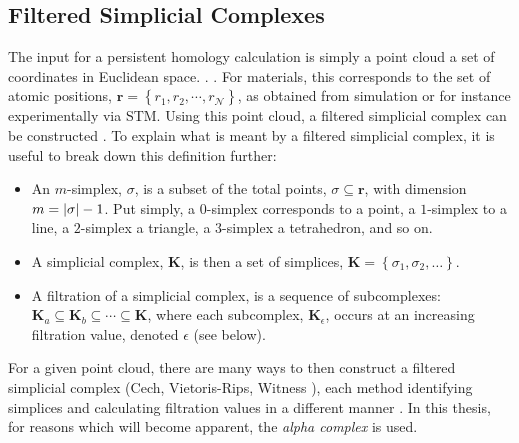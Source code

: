 \subsection{Filtered Simplicial Complexes}

The input for a persistent homology calculation is simply a point cloud \ie{} a set of coordinates in Euclidean space.
.
.
For materials, this corresponds to the set of atomic positions, $\mathbf{r}=\left\{r_1,r_2,\cdots,r_\mathcal{N}\right\}$, as obtained from simulation or for instance experimentally via STM.
Using this point cloud, a filtered simplicial complex can be constructed \cite{Fugacci2016}.
To explain what is meant by a filtered simplicial complex, it is useful to break down this definition further:
\begin{itemize}
	\item An $m$\--simplex, $\sigma$, is a subset of the total points, $\sigma\subseteq\mathbf{r}$, with dimension $m=\lvert\sigma\rvert-1$.
Put simply, a $0$\--simplex corresponds to a point, a $1$\--simplex to a line, a $2$\--simplex a triangle, a $3$\--simplex a tetrahedron, and so on.%
	\item A simplicial complex, $\mathbf{K}$, is then a set of simplices, $\mathbf{K}=\left\{\sigma_1,\sigma_2,\dots\right\}$.
	\item A filtration of a simplicial complex, is a sequence of subcomplexes: $\mathbf{K}_a \subseteq \mathbf{K}_b \subseteq \cdots \subseteq \mathbf{K}$, where each subcomplex, $\mathbf{K}_\epsilon$, occurs at an increasing filtration value, denoted $\epsilon$ (see below).
\end{itemize}
For a given point cloud, there are many ways to then construct a filtered simplicial complex (Cech, Vietoris\--Rips, Witness \etc), each method identifying simplices and calculating filtration values in a different manner  \cite{Otter2017}.
In this thesis, for reasons which will become apparent, the \textit{alpha complex} is used.

